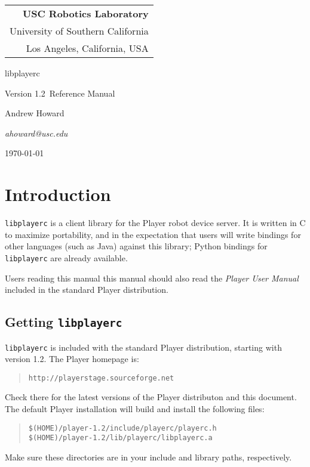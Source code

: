 \documentclass[11pt]{report}
\def\VERSION {1.2}
\def\HOMEPAGE {{\tt http://playerstage.sourceforge.net}}
\def\libplayerc {{\tt libplayerc} }
\begin{document}
\setcounter{page}{0}

\titlepage

\begin{flushright}
\begin{tabular}{r}
{\bf USC Robotics Laboratory}\\
University of Southern California\\
Los Angeles, California, USA\\
\end{tabular}
\end{flushright}

\vspace{5cm}
\centerline{\huge{libplayerc}}
\vspace{0.5cm}
\centerline{\large{Version \VERSION\ Reference Manual}}
\vspace{2cm}

\centerline{\large Andrew Howard}
\centerline{\sl ahoward@usc.edu}
\vspace{5cm}
\centerline{\today}

\newpage
\tableofcontents

\newpage
\setcounter{page}{0}

\chapter{Introduction}

\libplayerc is a client library for the Player robot device server.
It is written in C to maximize portability, and in the expectation
that users will write bindings for other languages (such as Java)
against this library; Python bindings for \libplayerc are already
available.

Users reading this manual this manual should also read the {\em Player
User Manual} included in the standard Player distribution.


\section{Getting \libplayerc}

\libplayerc is included with the standard Player distribution, starting with
version 1.2.  The Player homepage is:
\begin{quote}
\HOMEPAGE
\end{quote}
Check there for the latest versions of the Player distributon and this
document.  The default Player installation will build and install the
following files:
\begin{quote}
\begin{verbatim}
$(HOME)/player-1.2/include/playerc/playerc.h
$(HOME)/player-1.2/lib/playerc/libplayerc.a
\end{verbatim}
\end{quote}
Make sure these directories are in your include and library paths,
respectively.
\end{document}

